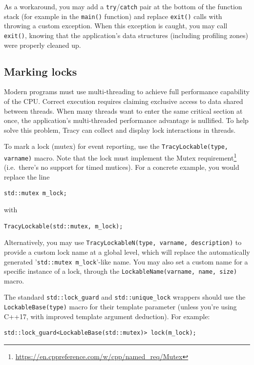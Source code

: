 \documentclass[hidelinks,titlepage,a4paper]{article}
\begin{document}
As a workaround, you may add a \texttt{try}/\texttt{catch} pair at the bottom of the function stack (for example in the \texttt{main()} function) and replace \texttt{exit()} calls with throwing a custom exception. When this exception is caught, you may call \texttt{exit()}, knowing that the application's data structures (including profiling zones) were properly cleaned up.

\subsection{Marking locks}

Modern programs must use multi-threading to achieve full performance capability of the CPU. Correct execution requires claiming exclusive access to data shared between threads. When many threads want to enter the same critical section at once, the application's multi-threaded performance advantage is nullified. To help solve this problem, Tracy can collect and display lock interactions in threads.

To mark a lock (mutex) for event reporting, use the \texttt{TracyLockable(type, varname)} macro. Note that the lock must implement the Mutex requirement\footnote{\url{https://en.cppreference.com/w/cpp/named_req/Mutex}} (i.e.\ there's no support for timed mutices). For a concrete example, you would replace the line

\begin{lstlisting}
std::mutex m_lock;
\end{lstlisting}

with

\begin{lstlisting}
TracyLockable(std::mutex, m_lock);
\end{lstlisting}

Alternatively, you may use \texttt{TracyLockableN(type, varname, description)} to provide a custom lock name at a global level, which will replace the automatically generated '\texttt{std::mutex m\_lock}'-like name. You may also set a custom name for a specific instance of a lock, through the \texttt{LockableName(varname, name, size)} macro.

The standard \texttt{std::lock\_guard} and \texttt{std::unique\_lock} wrappers should use the \texttt{LockableBase(type)} macro for their template parameter (unless you're using C++17, with improved template argument deduction). For example:

\begin{lstlisting}
std::lock_guard<LockableBase(std::mutex)> lock(m_lock);
\end{lstlisting}
\end{document}
